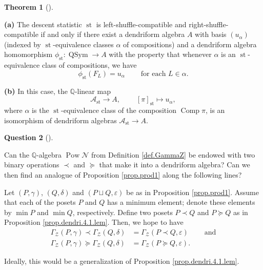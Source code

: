 \documentclass[numbers=enddot,12pt,final,onecolumn,notitlepage]{scrartcl}%
\theoremstyle{definition}
\newtheorem{theo}{Theorem}[section]
\newenvironment{theorem}[1][]
{\begin{theo}[#1]\begin{leftbar}}
{\end{leftbar}\end{theo}}
\newtheorem{quest}[theo]{Question}
\newenvironment{question}[1][]
{\begin{quest}[#1]\begin{leftbar}}
{\end{leftbar}\end{quest}}
\newenvironment{question}[1][Question]{\noindent\textbf{#1.} }{\ \rule{0.5em}{0.5em}}
\newenvironment{verlong}{}{}
\begin{document}
\begin{verlong}
\begin{theorem}
\textbf{(a)} The descent statistic $\operatorname*{st}$ is
left-shuffle-compatible and right-shuffle-compatible if and only if there
exist a dendriform algebra $A$ with
basis $\left(  u_{\alpha}\right)  $ (indexed by $\operatorname*{st}%
$-equivalence classes $\alpha$ of compositions)
and a dendriform algebra homomorphism
$\phi_{\operatorname*{st}}:\operatorname*{QSym} \rightarrow A$
with the property that whenever $\alpha$ is an
$\operatorname{st}$-equivalence class of compositions, we have
\[
\phi_{\operatorname*{st}}\left(  F_{L}\right)  =u_{\alpha}%
\ \ \ \ \ \ \ \ \ \ \text{for each }L\in\alpha.
\]

\textbf{(b)} In this case, the $\mathbb{Q}$-linear map%
\[
\mathcal{A}_{\operatorname*{st}}\rightarrow A,\ \ \ \ \ \ \ \ \ \ \left[
\pi\right]  _{\operatorname*{st}}\mapsto u_{\alpha},
\]
where $\alpha$ is the $\operatorname*{st}$-equivalence class of the
composition $\operatorname*{Comp}\pi$, is an isomorphism of dendriform
algebras $\mathcal{A}_{\operatorname*{st}}\rightarrow A$.
\end{theorem}

\begin{question}
Can the $\mathbb{Q}$-algebra $\operatorname*{Pow}\mathcal{N}$ from Definition
\ref{def.GammaZ} be endowed with two binary operations $\left.  \prec\right.
$ and $\left.  \succeq\right.  $ that make it into a dendriform algebra? Can
we then find an analogue of Proposition \ref{prop.prod1} along the following lines?

Let $\left(  P,\gamma\right)  $, $\left(  Q,\delta\right)  $ and $\left(
P\sqcup Q,\varepsilon\right)  $ be as in Proposition \ref{prop.prod1}. Assume
that each of the posets $P$ and $Q$ has a minimum element; denote these
elements by $\min P$ and $\min Q$, respectively. Define two posets $P\left.
\prec\right.  Q$ and $P\left.  \succeq\right.  Q$ as in Proposition
\ref{prop.dendri.4.1.lem}. Then, we hope to have%
\begin{align*}
\Gamma_{\mathcal{Z}}\left(  P,\gamma\right)  \left.  \prec\right.
\Gamma_{\mathcal{Z}}\left(  Q,\delta\right)   &  =\Gamma_{\mathcal{Z}}\left(
P\left.  \prec\right.  Q,\varepsilon\right)  \ \ \ \ \ \ \ \ \ \ \text{and}\\
\Gamma_{\mathcal{Z}}\left(  P,\gamma\right)  \left.  \succeq\right.
\Gamma_{\mathcal{Z}}\left(  Q,\delta\right)   &  =\Gamma_{\mathcal{Z}}\left(
P\left.  \succeq\right.  Q,\varepsilon\right)  .
\end{align*}


Ideally, this would be a generalization of Proposition
\ref{prop.dendri.4.1.lem}.
\end{question}


\end{verlong}
\end{document}

